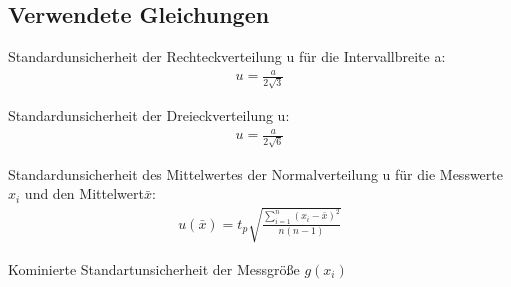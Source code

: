 

\subsection{Verwendete Gleichungen}\label{VGuD}







Standardunsicherheit der Rechteckverteilung u für die Intervallbreite a:
\begin{align}
	u=\frac{a}{2\sqrt{3}}\label{eq:sur}
	\end{align} 
	
	
Standardunsicherheit der Dreieckverteilung u: \begin{align}
	u=\frac{a}{2\sqrt{6}}\label{eq:sud}
\end{align}

Standardunsicherheit des Mittelwertes der Normalverteilung u für die Messwerte $x_i$ und den Mittelwert$\bar{x}$:
\begin{align}
	u(\bar{x})=  t_p  \sqrt{  \frac{\sum_{i=1}^{n}  (x_i-\bar{x})^2} {n (n-1)} }
	\label{eq:sunv}       
\end{align} 


Kominierte Standartunsicherheit der Messgröße $g(x_i)$

